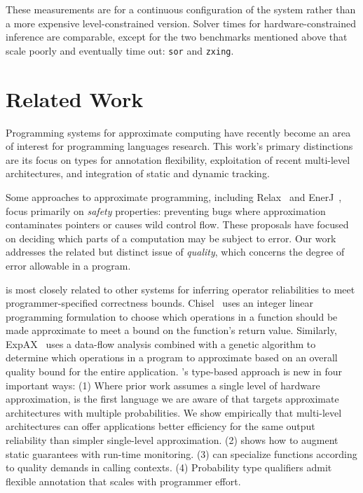 \documentclass[10pt,nocopyrightspace,preprint]{sigplanconf}
\newcommand{\code}{\lstinline[emphstyle={},keywordstyle={}]}
\begin{document}
These measurements are for a continuous configuration of the system rather
than a more expensive level-constrained version.
Solver times for hardware-constrained inference are comparable, except for the
two benchmarks mentioned above that scale poorly and eventually time out:
\code{sor} and \code{zxing}.




\section{Related Work}

Programming systems for approximate computing have recently become an area of
interest for programming languages research.
This work's primary distinctions are its focus on types for annotation
flexibility,
exploitation of recent multi-level architectures,
and integration of static and dynamic tracking.

Some approaches to approximate programming, including Relax~\cite{relax}
and EnerJ~\cite{enerj}, focus primarily on \emph{safety} properties:
preventing bugs where approximation contaminates pointers or causes wild
control flow.
These proposals have focused on deciding which parts of a computation may be
subject to error.
Our work addresses the related but distinct issue of \emph{quality}, which
concerns the degree of error allowable in a program.

\lang is most closely related to other systems for inferring operator
reliabilities to meet program\-mer-specified correctness bounds.
Chisel~\cite{chisel} uses an integer linear programming formulation
to choose which operations in a function should be made approximate to
meet a bound on the function's return value.
Similarly, ExpAX~\cite{expax-tr} uses a data-flow analysis combined with a
genetic algorithm to determine which operations in a program to approximate
based on an overall quality bound for the entire application.
\lang's type-based approach is new in four important ways:
(1) Where prior work assumes a single level of hardware approximation, \lang
is the first language we are aware of that targets approximate architectures
with multiple probabilities.
We show empirically that multi-level architectures can offer applications
better efficiency for the same output reliability than simpler single-level
approximation.
(2) \lang shows how to augment static guarantees with run-time monitoring.
(3) \lang can specialize functions according to quality demands in calling
contexts.
(4) Probability type qualifiers admit flexible annotation that scales with
programmer effort.
\end{document}
